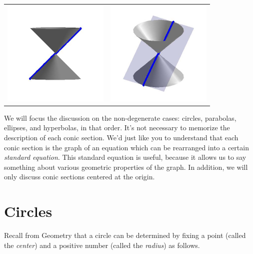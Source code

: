 \documentclass[nooutcomes]{ximera}
\begin{document}
\begin{center}
\begin{tabular}{cc}
\includegraphics[width=2in]{./ConicsGraphics/Tline01.jpg} & \includegraphics[width=2in]{./ConicsGraphics/Tline02.jpg} \\

\end{tabular}

\end{center}


We will focus the discussion on the non-degenerate cases: circles, parabolas, ellipses, and hyperbolas, in that order. It's not necessary to memorize the description of each conic section. We'd just like you to understand that each conic section is the graph of an equation which can be rearranged into a certain \emph{standard equation}. This standard equation is useful, because it allows us to say something about various geometric properties of the graph. In addition, we will only discuss conic sections centered at the origin.

\section{Circles}
Recall from Geometry that a circle can be determined by fixing a point (called the \emph{center}) and a positive number (called the \emph{radius}) as follows.    
\end{document}
